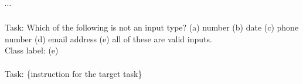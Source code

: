 \begin{table}[]
{\begin{minipage}{\dimexpr\linewidth-2\fboxsep-2\fboxrule}
$\cdots$ \\
\\
Task: Which of the following is not an input type? (a) number (b) date (c) phone number (d) email address (e) all of these are valid inputs.\\
Class label: (e)\\
\\
Task: \{instruction for the target task\}
\end{minipage}
}

    \caption{Prompt used for the output-first approach of instance generation. The model is prompted to generate the class label first, and then generate the corresponding input. This prompt is used for generating the instances for classification tasks.}
    \label{tab:output-first-generation-template}
\end{table}